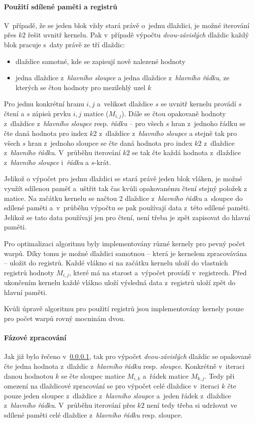 \paragraph{Použití sdílené paměti a registrů}\label{cuda:sdilena}
V~případě, že se jeden blok vždy stará právě o~jednu dlaždici, je možné iterování přes $k2$ řešit uvnitř kernelu. 
Pak v~případě výpočtu \emph{dvou-závislých} dlaždic každý blok pracuje s~daty právě ze tří dlaždic:
\begin{itemize}
    \item dlaždice samotné, kde se zapisují nově nalezené hodnoty
    \item jedna dlaždice z~\emph{hlavního sloupce} a jedna dlaždice z~\emph{hlavního řádku}, ze kterých se čtou hodnoty
        pro mezilehlý uzel $k$
\end{itemize}

Pro jednu konkrétní hranu $i,j$ a~velikost dlaždice $s$ se uvnitř kernelu provádí $s$ čtení a $s$ zápisů prvku $i,j$ matice ($M_{i,j}$).
Dále se čtou opakovaně hodnoty z~dlaždice z~\emph{hlavního sloupce} resp. \emph{řádku} -- pro všech $s$ hran z~jednoho řádku se čte
daná hodnota pro index $k2$ z~dlaždice z~\emph{hlavního sloupce} a stejně tak pro všech $s$ hran z~jednoho sloupce se čte daná hodnota
pro index $k2$ z~dlaždice z~\emph{hlavního řádku}. V~průběhu iterování $k2$ se tak čte každá hodnota z~dlaždice z~\emph{hlavního sloupce} 
i~\emph{řádku} a $s$-krát.

Jelikož o výpočet pro jednu dlaždici se stará právě jeden blok vláken, je možné využít sdílenou paměť a~uštřit tak čas kvůli opakovanému 
čtení stejný položek z matice. Na začátku kernelu se načtou 2 dlaždice z~\emph{hlavního řádku} a~sloupce do sdílené paměti a~v~průběhu 
výpočtu se pak používají data z~této sdílené paměti. Jelikož se tato data používají jen pro čtení, není třeba je zpět zapisovat do 
hlavní paměti.

Pro optimalizaci algoritmu byly implementovány různé kernely pro pevný počet warpů. Díky tomu je možné dlaždici samotnou -- která je 
kernelem zpracovávána -- uložit do registrů. Každé vlákno si na začátku kernelu uloží do vlastních registrů hodnoty $M_{i,j}$, které
má na starost a~výpočet provádí v~registrech. Před ukončením kernelu každé vlákno uloží výsledná data z~registrů uloží zpět do hlavní 
paměti.

Kvůli úpravě algoritmu pro použití registrů jsou implementovány kernely pouze pro počet warpů rovný mocninám dvou.

\paragraph{Fázové zpracování}
Jak již bylo řečeno v~\ref{cuda:sdilena}, tak pro výpočet \emph{dvou-závislých} dlaždic se opakovaně čte jedna hodnota z~dlaždic 
z~\emph{hlavního řádku} resp. \emph{sloupce}. Konkrétně v~iteraci danou hodnotou $k$ se čte sloupec matice $M_{i,k}$ a~řádek matice
$M_{k,j}$. Tedy při omezení na dlaždicové zpracování se pro výpočet celé dlaždice v~iteraci $k$ čte pouze jeden sloupec z~dlaždice
z~\emph{hlavního sloupce} a~jeden řádek z~dlaždice z~\emph{hlavního řádku}. V~průběhu iterování přes $k2$ není tedy třeba si udržovat 
ve sdílené paměti celé dlaždice z~\emph{hlavního řádku} resp. sloupce.

